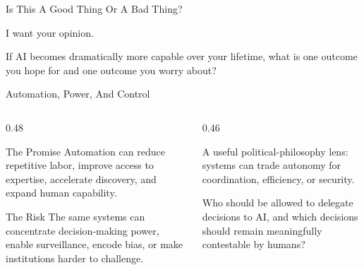 \documentclass[aspectratio=169]{beamer}
\begin{document}

\begin{frame}{Is This A Good Thing Or A Bad Thing?}
  \begin{center}
    {\Huge I want your opinion.}
  \end{center}
  \vspace{0.16in}
  \begin{activity}
    If AI becomes dramatically more capable over your lifetime, what is one outcome you hope for and one outcome you worry about?
  \end{activity}
\end{frame}

\begin{frame}[shrink=4]{Automation, Power, And Control}
  \begin{columns}[T,onlytextwidth]
    \begin{column}{0.48\textwidth}
      \begin{block}{The Promise}
        Automation can reduce repetitive labor, improve access to expertise, accelerate discovery, and expand human capability.
      \end{block}
      \begin{block}{The Risk}
        The same systems can concentrate decision-making power, enable surveillance, encode bias, or make institutions harder to challenge.
      \end{block}
    \end{column}
    \begin{column}{0.46\textwidth}
      \begin{exampleblockcp}
        A useful political-philosophy lens: systems can trade autonomy for coordination, efficiency, or security.
      \end{exampleblockcp}
      \vspace{0.10in}
      \begin{activity}
        Who should be allowed to delegate decisions to AI, and which decisions should remain meaningfully contestable by humans?
      \end{activity}
    \end{column}
  \end{columns}
\end{frame}
\end{document}

